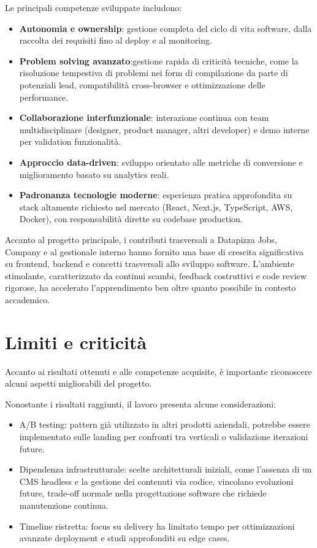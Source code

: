 Le principali competenze sviluppate includono:
\begin{itemize}
  \item \textbf{Autonomia e ownership}: gestione completa del ciclo di vita software, 
        dalla raccolta dei requisiti fino al deploy e al monitoring.
  \item \textbf{Problem solving avanzato}:gestione rapida di criticità tecniche, come la risoluzione tempestiva di problemi nei form di compilazione da parte di potenziali lead, compatibilità cross-browser e ottimizzazione delle performance.
  \item \textbf{Collaborazione interfunzionale}: interazione continua con team 
        multidisciplinare (designer, product manager, altri developer) e demo 
        interne per validation funzionalità.
  \item \textbf{Approccio data-driven}: sviluppo orientato alle metriche di conversione
        e miglioramento basato su analytics reali.
  \item \textbf{Padronanza tecnologie moderne}: esperienza pratica approfondita 
        su stack altamente richiesto nel mercato (React, Next.js, TypeScript, 
        AWS, Docker), con responsabilità dirette su codebase production.
\end{itemize}

Accanto al progetto principale, i contributi trasversali a Datapizza Jobs, Company
e al gestionale interno hanno fornito una base di crescita significativa su frontend, 
backend e concetti trasversali allo sviluppo software. L'ambiente stimolante, 
caratterizzato da continui scambi, feedback costruttivi e code review rigorose, 
ha accelerato l'apprendimento ben oltre quanto possibile in contesto accademico.

\section{Limiti e criticità}
Accanto ai risultati ottenuti e alle competenze acquisite, è importante riconoscere 
alcuni aspetti migliorabili del progetto.

Nonostante i risultati raggiunti, il lavoro presenta alcune considerazioni:
\begin{itemize}
  \item A/B testing: pattern già utilizzato in altri prodotti aziendali, 
        potrebbe essere implementato sulle landing per confronti tra verticali 
        o validazione iterazioni future.
  \item Dipendenza infrastrutturale: scelte architetturali iniziali, come l'assenza 
        di un CMS headless e la gestione dei contenuti via codice, vincolano 
        evoluzioni future, trade-off normale nella progettazione software che 
        richiede manutenzione continua.
  \item Timeline ristretta: focus su delivery ha limitato tempo per ottimizzazioni 
        avanzate deployment e studi approfonditi su edge cases.
\end{itemize}

